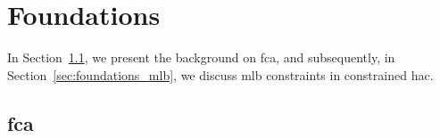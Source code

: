 \section{Foundations}
\label{sec:foundations}

In Section~\ref{sec:foundations_fca}, we present the background on \ac{fca}, 
and subsequently, in Section~\ref{sec:foundations_mlb}, we discuss \ac{mlb} constraints in constrained \ac{hac}. 

\subsection{\ac{fca}}
\label{sec:foundations_fca}



% 



% 

% 
